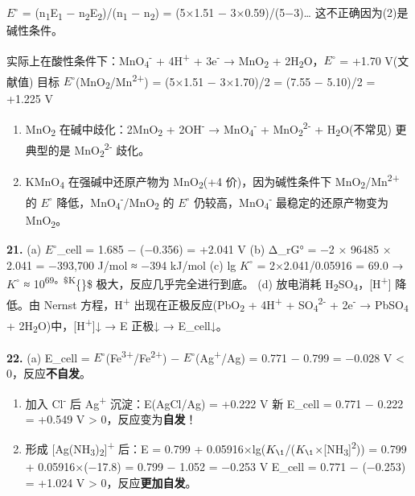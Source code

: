\documentclass[a4paper,11pt]{ctexart}
\begin{document}
\(E^{\circ}\) = (n\textsubscript{1}E\textsubscript{1} − n\textsubscript{2}E\textsubscript{2})/(n\textsubscript{1} − n\textsubscript{2}) = (5×1.51 − 3×0.59)/(5−3)\ldots{} 这不正确因为(2)是碱性条件。

实际上在酸性条件下：MnO\textsubscript{4}\textsuperscript{-} + 4H\textsuperscript{+} + 3e\textsuperscript{-} → MnO\textsubscript{2} + 2H\textsubscript{2}O，\(E^{\circ}\) = +1.70 V(文献值)
目标 \(E^{\circ}\)(MnO\textsubscript{2}/Mn\textsuperscript{2+}) = (5×1.51 − 3×1.70)/2 = (7.55 − 5.10)/2 = +1.225 V

\begin{enumerate}
\def\labelenumi{(\alph{enumi})}
\setcounter{enumi}{1}
\item
  MnO\textsubscript{2} 在碱中歧化：2MnO\textsubscript{2} + 2OH\textsuperscript{-} → MnO\textsubscript{4}\textsuperscript{-} + MnO\textsubscript{2}\textsuperscript{2-} + H\textsubscript{2}O(不常见)
  更典型的是 MnO\textsubscript{2}\textsuperscript{2-} 歧化。
\item
  KMnO\textsubscript{4} 在强碱中还原产物为 MnO\textsubscript{2}(+4 价)，因为碱性条件下 MnO\textsubscript{2}/Mn\textsuperscript{2+} 的 \(E^{\circ}\) 降低，MnO\textsubscript{4}\textsuperscript{-}/MnO\textsubscript{2} 的 \(E^{\circ}\) 仍较高，MnO\textsubscript{4}\textsuperscript{-} 最稳定的还原产物变为 MnO\textsubscript{2}。
\end{enumerate}

\textbf{21.}
(a) \(E^{\circ}\)\_cell = 1.685 − (−0.356) = +2.041 V
(b) Δ\_rG° = −2 × 96485 × 2.041 = −393,700 J/mol ≈ −394 kJ/mol
(c) lg \(K^{\circ}\) = 2×2.041/0.05916 = 69.0 → \(K^{\circ}\) ≈ 10\textsuperscript{69。\$K}\{\circ\}\$ 极大，反应几乎完全进行到底。
(d) 放电消耗 H\textsubscript{2}SO\textsubscript{4}，{[}H\textsuperscript{+}{]} 降低。由 Nernst 方程，H\textsuperscript{+} 出现在正极反应(PbO\textsubscript{2} + 4H\textsuperscript{+} + SO\textsubscript{4}\textsuperscript{2-} + 2e\textsuperscript{-} → PbSO\textsubscript{4} + 2H\textsubscript{2}O)中，{[}H\textsuperscript{+}{]}↓ → E 正极↓ → E\_cell↓。

\textbf{22.}
(a) E\_cell = \(E^{\circ}\)(Fe\textsuperscript{3+}/Fe\textsuperscript{2+}) − \(E^{\circ}\)(Ag\textsuperscript{+}/Ag) = 0.771 − 0.799 = −0.028 V \textless{} 0，反应\textbf{不自发}。

\begin{enumerate}
\def\labelenumi{(\alph{enumi})}
\setcounter{enumi}{1}
\item
  加入 Cl\textsuperscript{-} 后 Ag\textsuperscript{+} 沉淀：E(AgCl/Ag) = +0.222 V
  新 E\_cell = 0.771 − 0.222 = +0.549 V \textgreater{} 0，反应变为\textbf{自发}！
\item
  形成 {[}Ag(NH\textsubscript{3})\textsubscript{2}{]}\textsuperscript{+} 后：E = 0.799 + 0.05916×lg(\(K_{\1}\)/(\(K_{\1}\)×{[}NH\textsubscript{3}{]}\textsuperscript{2}))
  = 0.799 + 0.05916×(−17.8) = 0.799 − 1.052 = −0.253 V
  E\_cell = 0.771 − (−0.253) = +1.024 V \textgreater{} 0，反应\textbf{更加自发}。
\end{enumerate}
\end{document}

